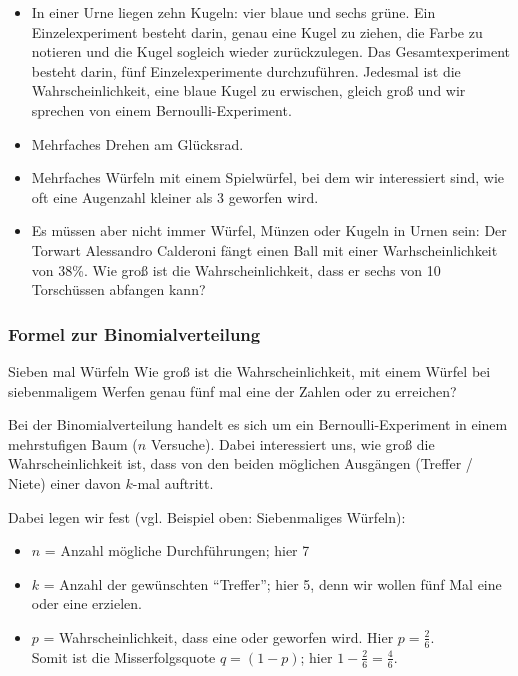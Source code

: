 \begin{itemize}
\item
In einer Urne liegen zehn Kugeln: vier blaue und sechs grüne. Ein
Einzelexperiment besteht darin, genau eine Kugel zu ziehen, die Farbe
zu notieren und die Kugel sogleich wieder zurückzulegen.
Das Gesamtexperiment besteht darin, fünf Einzelexperimente
durchzuführen. Jedesmal ist die Wahrscheinlichkeit, eine blaue Kugel
zu erwischen, gleich groß und wir sprechen von einem Bernoulli-Experiment.

\item Mehrfaches Drehen am Glücksrad.

\item Mehrfaches Würfeln mit einem Spielwürfel, bei dem wir
  interessiert sind, wie oft eine Augenzahl kleiner als 3 geworfen wird.
  
\item
Es müssen aber nicht immer Würfel, Münzen oder Kugeln in Urnen sein:
Der Torwart Alessandro Calderoni fängt einen Ball mit einer
Warhscheinlichkeit von 38\%.
Wie groß ist die Wahrscheinlichkeit, dass er sechs von 10 Torschüssen
abfangen kann?
\end{itemize}
\newpage


\subsubsection{Formel zur Binomialverteilung}


\begin{beispiel}{Sieben mal Würfeln}{}
Wie groß ist die Wahrscheinlichkeit, mit einem Würfel bei
siebenmaligem Werfen genau fünf mal eine der Zahlen  oder
 zu erreichen?
\end{beispiel}

Bei der Binomialverteilung handelt es sich um ein
Bernoulli-Experiment
in einem mehrstufigen Baum ($n$ Versuche). Dabei interessiert
uns, wie groß die Wahrscheinlichkeit ist, dass von den beiden
möglichen Ausgängen (Treffer / Niete) einer davon $k$-mal auftritt.

Dabei legen wir fest (vgl. Beispiel oben: Siebenmaliges Würfeln):
\begin{itemize}
\item
  $n$ = Anzahl mögliche Durchführungen; hier 7
\item
  $k$ = Anzahl der gewünschten ``Treffer''; hier 5, denn wir wollen fünf
Mal eine  oder eine  erzielen.
\item
  $p$ = Wahrscheinlichkeit, dass eine  oder 
  geworfen wird. Hier $p = \frac26$.\\
  Somit ist die Misserfolgsquote $q = (1-p)$; hier $1-\frac26=\frac46$.
\end{itemize}

